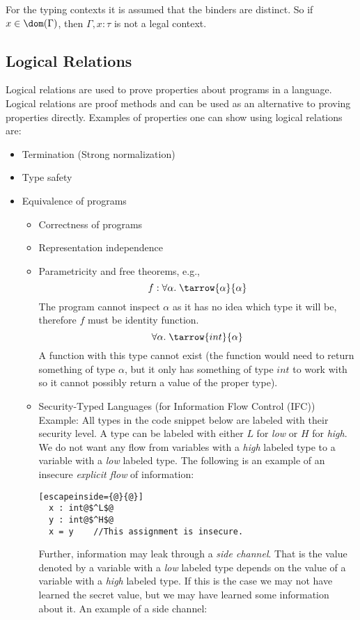 For the typing contexts it is assumed that the binders are distinct. So if $x \in \dom(\Gamma)$, then $\Gamma , x : \tau$ is not a legal context.
\subsection*{Logical Relations}
Logical relations are used to prove properties about programs in a language. Logical relations are proof methods and can be used as an alternative to proving properties directly. Examples of properties one can show using logical relations are:
\begin{itemize}
\item Termination (Strong normalization)
\item Type safety
\item Equivalence of programs
  \begin{itemize}
  \item Correctness of programs
  \item Representation independence
  \item Parametricity and free theorems, e.g.,
    \[
    f: \forall \alpha. \; \tarrow{\alpha}{\alpha}
    \]
    The program cannot inspect $\alpha$ as it has no idea which type it will be, therefore $f$ must be identity function.
    \[
    \forall \alpha. \; \tarrow{int}{\alpha}
    \]
    A function with this type cannot exist (the function would need to return something of type $\alpha$, but it only has something of type $int$ to work with so it cannot possibly return a value of the proper type).
  \item Security-Typed Languages (for Information Flow Control (IFC))\\
        Example: All types in the code snippet below are labeled with their security level. A type can be labeled with either $L$ for \emph{low} or $H$ for \emph{high}. We do not want any flow from variables with a \emph{high} labeled type to a variable with a \emph{low} labeled type. The following is an example of an insecure \emph{explicit flow} of information:
        \begin{lstlisting}[escapeinside={@}{@}]
  x : int@$^L$@
  y : int@$^H$@
  x = y    //This assignment is insecure.
        \end{lstlisting}
Further, information may leak through a \emph{side channel}. That is the value denoted by a variable with a \emph{low} labeled type depends on the value of a variable with a \emph{high} labeled type. If this is the case we may not have learned the secret value, but we may have learned some information about it. An example of a side channel:

\end{itemize}
\end{itemize}
